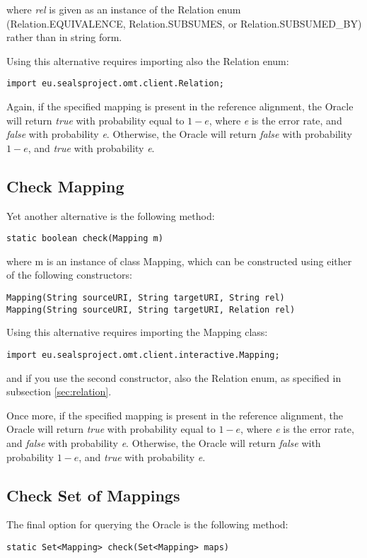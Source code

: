 \documentclass{article}
\begin{document}
\noindent
where \textit{rel} is given as an instance of the Relation enum (Relation.EQUIVALENCE, Relation.SUBSUMES, or Relation.SUBSUMED\_BY) rather than in string form.

Using this alternative requires importing also the Relation enum:
\begin{verbatim}
import eu.sealsproject.omt.client.Relation;
\end{verbatim}

Again, if the specified mapping is present in the reference alignment, the Oracle will return \textit{true} with probability equal to \(1-e\), where \textit{e} is the error rate, and \textit{false} with probability \textit{e}. Otherwise, the Oracle will return \textit{false} with probability \(1-e\), and \textit{true} with probability \textit{e}.

\subsection{Check Mapping}
\label{sec:mapping}
Yet another alternative is the following method:
\begin{verbatim}
static boolean check(Mapping m)
\end{verbatim}

\noindent
where m is an instance of class Mapping, which can be constructed using either of the following constructors:
\begin{verbatim}
Mapping(String sourceURI, String targetURI, String rel)
Mapping(String sourceURI, String targetURI, Relation rel)
\end{verbatim}

Using this alternative requires importing the Mapping class:
\begin{verbatim}
import eu.sealsproject.omt.client.interactive.Mapping;
\end{verbatim}

\noindent
and if you use the second constructor, also the Relation enum, as specified in subsection \ref{sec:relation}.

Once more, if the specified mapping is present in the reference alignment, the Oracle will return \textit{true} with probability equal to \(1-e\), where \textit{e} is the error rate, and \textit{false} with probability \textit{e}. Otherwise, the Oracle will return \textit{false} with probability \(1-e\), and \textit{true} with probability \textit{e}.

\subsection{Check Set of Mappings}
\label{sec:set}
The final option for querying the Oracle is the following method:
\begin{verbatim}
static Set<Mapping> check(Set<Mapping> maps)
\end{verbatim}
\end{document}
